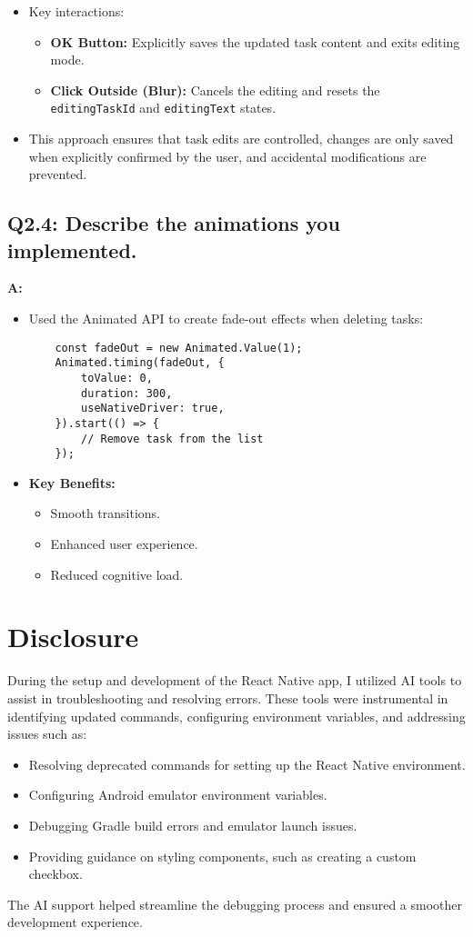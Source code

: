 \documentclass{article}
\begin{document}
\begin{itemize}
    \item Key interactions:
    \begin{itemize}
        \item \textbf{OK Button:} Explicitly saves the updated task content and exits editing mode.
        \item \textbf{Click Outside (Blur):} Cancels the editing and resets the \texttt{editingTaskId} and \texttt{editingText} states.
    \end{itemize}

    \item This approach ensures that task edits are controlled, changes are only saved when explicitly confirmed by the user, and accidental modifications are prevented.
\end{itemize}


\subsection*{Q2.4: Describe the animations you implemented.}
\textbf{A:}
\begin{itemize}
    \item Used the Animated API to create fade-out effects when deleting tasks:
    \begin{verbatim}
    const fadeOut = new Animated.Value(1);
    Animated.timing(fadeOut, {
        toValue: 0,
        duration: 300,
        useNativeDriver: true,
    }).start(() => {
        // Remove task from the list
    });
    \end{verbatim}
    \item \textbf{Key Benefits:}
    \begin{itemize}
        \item Smooth transitions.
        \item Enhanced user experience.
        \item Reduced cognitive load.
    \end{itemize}
\end{itemize}

\section*{Disclosure}
During the setup and development of the React Native app, I utilized AI tools to assist in troubleshooting and resolving errors. These tools were instrumental in identifying updated commands, configuring environment variables, and addressing issues such as:
\begin{itemize}
    \item Resolving deprecated commands for setting up the React Native environment.
    \item Configuring Android emulator environment variables.
    \item Debugging Gradle build errors and emulator launch issues.
    \item Providing guidance on styling components, such as creating a custom checkbox.
\end{itemize}
The AI support helped streamline the debugging process and ensured a smoother development experience.
\end{document}
